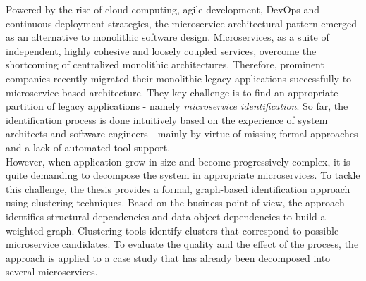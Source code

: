 

\Abstract
Powered by the rise of cloud computing, agile development, DevOps and continuous deployment strategies, the microservice architectural pattern emerged as an alternative to monolithic software design. Microservices, as a suite of independent, highly cohesive and loosely coupled services, overcome the shortcoming of centralized monolithic architectures. Therefore, prominent companies recently migrated their monolithic legacy applications successfully to microservice-based architecture. They key challenge is to find an appropriate partition of legacy applications - namely \textit{microservice identification}. So far, the identification process is done intuitively based on the experience of system architects and software engineers - mainly by virtue of missing formal approaches and a lack of automated tool support. \\
However, when application grow in size and become progressively complex, it is quite demanding to decompose the system in appropriate microservices.
To tackle this challenge, the thesis provides a formal, graph-based identification approach using clustering techniques. Based on the business point of view, the approach identifies structural dependencies and data object dependencies to build a weighted graph. Clustering tools identify clusters that correspond to possible microservice candidates. To evaluate the quality and the effect of the process, the approach is applied to a case study that has already been decomposed into several microservices. 



